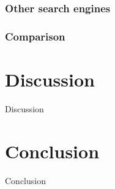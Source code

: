 \subsubsection{Other search engines}

\subsubsection{Comparison}

\section{Discussion}
\label{section:Discussion}
Discussion

\section{Conclusion}
\label{section:Conclusion}
Conclusion



